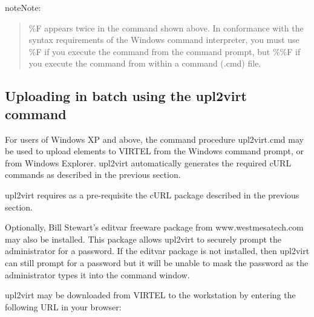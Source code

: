 \documentclass[letterpaper,10pt,english]{sphinxmanual}
\begin{document}
\begin{sphinxadmonition}{note}{Note:}\begin{quote}

\%F appears twice in the command shown above. In conformance with the syntax requirements of the Windows command interpreter, you must use \%F if you execute the command from the command prompt, but \%\%F if you execute the command from within a command (.cmd) file.
\end{quote}

\end{sphinxadmonition}


\subsection{Uploading in batch using the upl2virt command}
\label{\detokenize{audit_operations_ and_performance:index-65}}\label{\detokenize{audit_operations_ and_performance:uploading-in-batch-using-the-upl2virt-command}}
For users of Windows XP and above, the command procedure upl2virt.cmd may be used to upload elements to VIRTEL from the Windows command prompt, or from Windows Explorer. upl2virt automatically generates the required cURL commands as described in the previous section.


upl2virt requires as a pre-requisite the cURL package described in the previous section.

Optionally, Bill Stewart’s editvar freeware package from www.westmesatech.com may also be installed. This package allows upl2virt to securely prompt the administrator for a password. If the editvar package is not installed, then upl2virt can still prompt for a password but it will be unable to mask the password as the administrator types it into
the command window.


upl2virt may be downloaded from VIRTEL to the workstation by entering the following URL in your browser:

\begin{sphinxVerbatim}[commandchars=\\\{\}]
\end{sphinxVerbatim}
\end{document}
